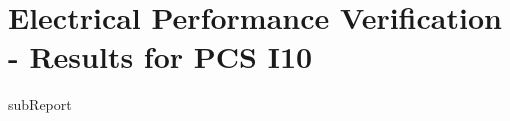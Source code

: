 \renewcommand{\DTRPcs}{I10} %
\renewcommand{\DTRPcsLong}{I10}


    \section{Electrical Performance Verification - Results for PCS \DTRPcsLong}

    {{subReport}}
    \newpage

